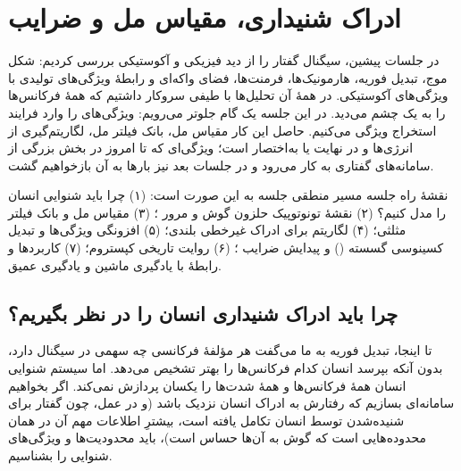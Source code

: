 \chapter{ادراک شنیداری، مقیاس مل و ضرایب }

در جلسات پیشین، سیگنال گفتار را از دید فیزیکی و آکوستیکی بررسی کردیم: شکل موج، تبدیل فوریه، هارمونیک‌ها، فرمنت‌ها، فضای واکه‌ای و رابطهٔ ویژگی‌های تولیدی با ویژگی‌های آکوستیکی. در همهٔ آن تحلیل‌ها با طیفی سروکار داشتیم که همهٔ فرکانس‌ها را به یک چشم می‌دید. در این جلسه یک گام جلوتر می‌رویم: ویژگی‌های  را وارد فرایند استخراج ویژگی می‌کنیم. حاصل این کار مقیاس مل، بانک فیلتر مل، لگاریتم‌گیری از انرژی‌ها و در نهایت  یا به‌اختصار  است؛ ویژگی‌ای که تا امروز در بخش بزرگی از سامانه‌های گفتاری به کار می‌رود و در جلسات بعد نیز بارها به آن بازخواهیم گشت.

\begin{exambox}{نقشهٔ راه جلسه}
مسیر منطقی جلسه به این صورت است: (۱) چرا باید شنوایی انسان را مدل کنیم؟ (۲) نقشهٔ تونوتوپیک حلزون گوش و مرور ؛ (۳) مقیاس مل و بانک فیلتر مثلثی؛ (۴) لگاریتم برای ادراک غیرخطی بلندی؛ (۵) افزونگی ویژگی‌ها و تبدیل کسینوسی گسسته () و پیدایش ضرایب ؛ (۶) روایت تاریخی کپستروم؛ (۷) کاربردها و رابطهٔ  با یادگیری ماشین و یادگیری عمیق.
\end{exambox}

\section{چرا باید ادراک شنیداری انسان را در نظر بگیریم؟}

تا اینجا، تبدیل فوریه به ما می‌گفت هر مؤلفهٔ فرکانسی چه سهمی در سیگنال دارد، بدون آنکه بپرسد انسان کدام فرکانس‌ها را بهتر تشخیص می‌دهد. اما سیستم شنوایی انسان همهٔ فرکانس‌ها و همهٔ شدت‌ها را یکسان پردازش نمی‌کند. اگر بخواهیم سامانه‌ای بسازیم که رفتارش به ادراک انسان نزدیک باشد (و در عمل، چون گفتار برای شنیده‌شدن توسط انسان تکامل یافته است، بیشترِ اطلاعات مهم آن در همان محدوده‌هایی است که گوش به آن‌ها حساس است)، باید محدودیت‌ها و ویژگی‌های شنوایی را بشناسیم.

